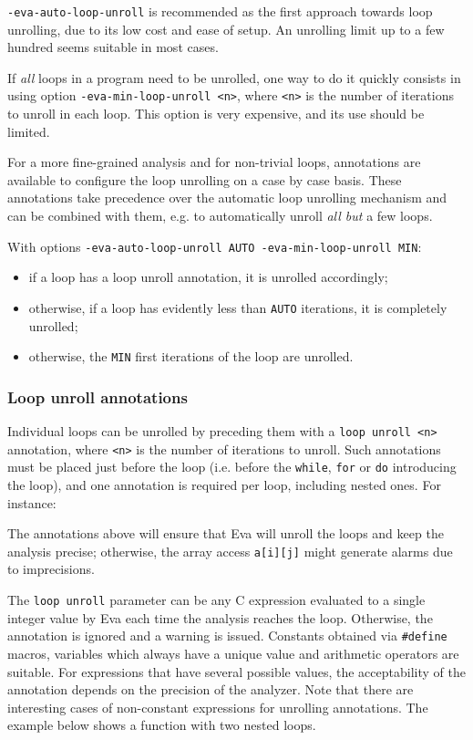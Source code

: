 \documentclass[web]{frama-c-book}
\newcommand{\Eva}{\textsf{Eva}}
\begin{document}
\lstinline|-eva-auto-loop-unroll| is recommended as the first approach towards
loop unrolling, due to its low cost and ease of setup. An unrolling limit
up to a few hundred seems suitable in most cases.

If \emph{all} loops in a program need to be unrolled, one way to do it quickly
consists in using option \lstinline|-eva-min-loop-unroll <n>|,
where \lstinline|<n>| is the number of iterations to unroll in each loop.
This option is very expensive, and its use should be limited.

For a more fine-grained analysis and for non-trivial loops,
annotations are available to configure the loop unrolling on a case by case
basis.
These annotations take precedence over the automatic loop unrolling mechanism
and can be combined with them, e.g. to automatically unroll {\em all but} a few
loops.

With options \lstinline|-eva-auto-loop-unroll AUTO -eva-min-loop-unroll MIN|:
\begin{itemize}
\item if a loop has a loop unroll annotation, it is unrolled accordingly;
\item otherwise, if a loop has evidently less than \lstinline|AUTO| iterations,
  it is completely unrolled;
\item otherwise, the \lstinline|MIN| first iterations of the loop are unrolled.
\end{itemize}

\subsubsection{Loop unroll annotations}

Individual loops can be unrolled by preceding them with a
\lstinline|loop unroll <n>| annotation, where \lstinline|<n>| is the number
of iterations to unroll.
Such annotations must be placed just before the loop (i.e. before the
\lstinline|while|, \lstinline|for| or \lstinline|do| introducing the loop),
and one annotation is required per loop, including nested ones. For instance:



The annotations above will ensure
that \Eva{} will unroll the loops and keep the analysis precise; otherwise,
the array access \lstinline|a[i][j]| might generate alarms due to imprecisions.

The \lstinline|loop unroll| parameter can be any C expression evaluated to a
single integer value by \Eva{} each time the analysis reaches the loop.
Otherwise, the annotation is ignored and a warning is issued.
Constants obtained via \lstinline|#define| macros, variables which always have
a unique value and arithmetic operators are suitable.
For expressions that have several possible values,
the acceptability of the annotation depends on the precision of the analyzer.
Note that there are interesting cases of non-constant expressions for
unrolling annotations. The example below shows a function with two nested loops.
\end{document}
